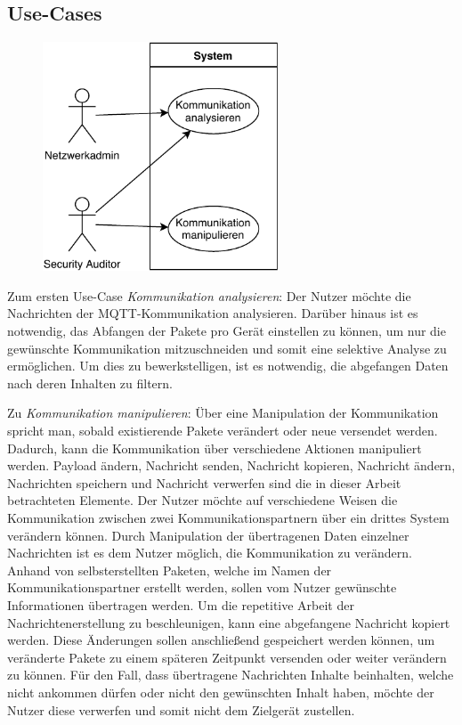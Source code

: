     \subsection{Use-Cases}
    \begin{figure}[h]%
        \centering
        \includegraphics[width=7cm]{tex/bilder/3_anforderungen/Use-Case.pdf}
        \label{fig:use-case}
    \end{figure}
    
    Zum ersten Use-Case \emph{Kommunikation analysieren}:
    	Der Nutzer möchte die Nachrichten der \ac{MQTT}-Kommunikation analysieren.
    	Darüber hinaus ist es notwendig, das Abfangen der Pakete pro Gerät einstellen zu können, um nur die gewünschte Kommunikation mitzuschneiden und somit eine selektive Analyse zu ermöglichen.
    	Um dies zu bewerkstelligen, ist es notwendig, die abgefangen Daten nach deren Inhalten zu filtern.
    	
    Zu \emph{Kommunikation manipulieren}:
        Über eine Manipulation der Kommunikation spricht man, sobald existierende Pakete verändert oder neue versendet werden. Dadurch, kann die Kommunikation über verschiedene Aktionen manipuliert werden. \glqq Payload ändern\grqq{}, \glqq Nachricht senden\grqq{}, \glqq Nachricht kopieren\grqq{}, \glqq Nachricht ändern\grqq{}, \glqq Nachrichten speichern\grqq{} und \glqq Nachricht verwerfen\grqq{} sind die in dieser Arbeit betrachteten Elemente.
    	Der Nutzer möchte auf verschiedene Weisen die Kommunikation zwischen zwei Kommunikationspartnern über ein drittes System verändern können.
    	Durch Manipulation der übertragenen Daten einzelner Nachrichten ist es dem Nutzer möglich, die Kommunikation zu verändern.
    	Anhand von selbsterstellten Paketen, welche im Namen der Kommunikationspartner erstellt werden, sollen vom Nutzer gewünschte Informationen übertragen werden.
    	Um die repetitive Arbeit der Nachrichtenerstellung zu beschleunigen, kann eine abgefangene Nachricht kopiert werden.
    	Diese Änderungen sollen anschließend gespeichert werden können, um veränderte Pakete zu einem späteren Zeitpunkt versenden oder weiter verändern zu können.
    	Für den Fall, dass übertragene Nachrichten Inhalte beinhalten, welche nicht ankommen dürfen oder nicht den gewünschten Inhalt haben, möchte der Nutzer diese verwerfen und somit nicht dem Zielgerät zustellen.

